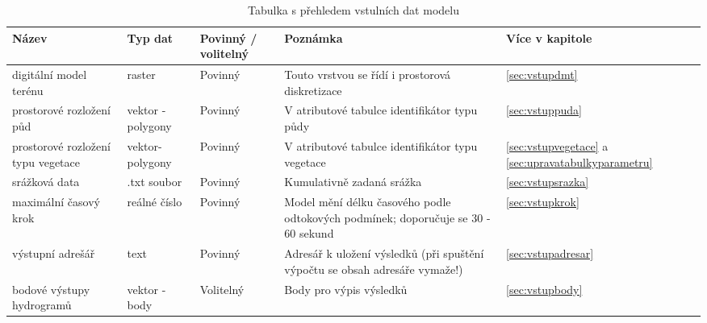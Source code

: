 
% 
\begin{sidewaystable}
\centering
\caption{Tabulka s přehledem vstulních dat modelu}
\label{tab:vstupy}
\small{
\begin{tabular}{p{}lp{}p{}l}
\hline
Název                              & Typ dat                       & Povinný / volitelný & Poznámka                                                                                      & Více v kapitole                                                 \\ \hline \hline
digitální model terénu             & raster                        & Povinný           & Touto vrstvou se řídí i prostorová diskretizace                                                 & \ref{sec:vstupdmt}                                           \\ 
prostorové rozložení půd           & vektor - polygony             & Povinný           & V atributové tabulce identifikátor typu půdy                                               & \ref{sec:vstuppuda}                                          \\ 
prostorové rozložení typu vegetace & vektor- polygony              & Povinný           & V atributové tabulce identifikátor typu vegetace                                           & \ref{sec:vstupvegetace} a \ref{sec:upravatabulkyparametru}   \\ 
srážková data                      & .txt soubor                   & Povinný           & Kumulativně zadaná srážka                                                                       & \ref{sec:vstupsrazka}                                        \\ 
maximální časový krok              & reálné číslo                  & Povinný           & Model mění délku časového podle odtokových podmínek; doporučuje se 30 - 60 sekund               & \ref{sec:vstupkrok}                                          \\ 
výstupní adrešář                   & text                          & Povinný           & Adresář k uložení výsledků (při spuštění výpočtu se obsah adresáře vymaže!)                            & \ref{sec:vstupadresar}                                       \\ 
bodové výstupy hydrogramů          & vektor - body                 & Volitelný         & Body pro výpis výsledků                                                                   & \ref{sec:vstupbody}                                          \\ 

\end{tabular}}
\end{sidewaystable}
